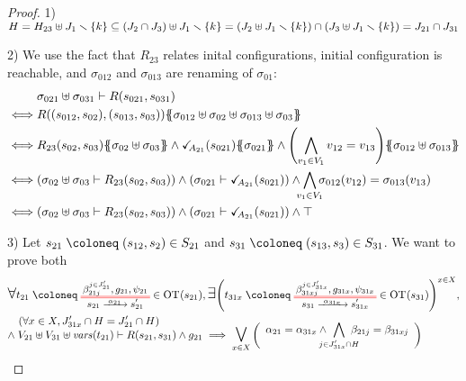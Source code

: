 \documentclass{article}
\begin{document}
\begin{proof}
\item[1)] \(H = H_{23} \uplus J_1 \smallsetminus {\left\{k\right\}} \subseteq {\left(J_2 \cap J_3\right)} \uplus J_1 \smallsetminus {\left\{k\right\}} = {\left(J_2 \uplus J_1 \smallsetminus {\left\{k\right\}}\right)} \cap {\left(J_3 \uplus J_1 \smallsetminus{\left\{k\right\}}\right)} = J_{21} \cap J_{31}\)
\item[2)] We use the fact that \(R_{23}\) relates inital configurations, initial configuration is reachable, and \(\sigma_{012}\) and \(\sigma_{013}\) are renaming of \(\sigma_{01}\):
	\begin{align*}
		& \sigma_{021} \uplus \sigma_{031} \vdash R\mpar{s_{021}, s_{031}} \\
		\iff & R\mpar{\mpar{s_{012}, s_{02}}, \mpar{s_{013}, s_{03}}}\psubst{\sigma_{012} \uplus \sigma_{02} \uplus \sigma_{013} \uplus \sigma_{03}} \\
		\iff & R_{23}\mpar{s_{02}, s_{03}}\psubst{\sigma_{02} \uplus \sigma_{03}} \wedge \reach{A_{21}}\mpar{s_{021}}\psubst{\sigma_{021}} \wedge \mpar{\bigwedge_{v_1 \in V_1} v_{12} = v_{13}}\psubst{\sigma_{012} \uplus \sigma_{013}} \\
		\iff & \mpar{\sigma_{02} \uplus \sigma_{03} \vdash R_{23}\mpar{s_{02}, s_{03}}} \wedge \mpar{\sigma_{021} \vdash \reach{A_{21}}\mpar{s_{021}}} \wedge \bigwedge_\subbox{v_1 \in V_1} \sigma_{012}\mpar{v_{12}} = \sigma_{013}\mpar{v_{13}} \\
		\iff & \mpar{\sigma_{02} \uplus \sigma_{03} \vdash R_{23}\mpar{s_{02}, s_{03}}} \wedge \mpar{\sigma_{021} \vdash \reach{A_{21}}\mpar{s_{021}}} \wedge \top
	\end{align*}
\item[3)] Let \(s_{21} \defobject \mpar{s_{12}, s_2} \in S_{21}\) and \(s_{31} \defobject \mpar{s_{13}, s_3} \in S_{31}\).
	We want to prove both
	\begin{align*}
		& \bigsymb{\forall} t_{21} \defobject \OTx{21}{}{21}{21} \in \fOT{s_{21}}, \bigsymb{\exists} \mpar{t_{31x} \defobject \OTx{31}{x}{31x}{31x} \in \fOT{s_{31}}}^{x \in X}, \\
		& \quad \mpar{\forall x \in X, J'_{31x} \cap H = J'_{21} \cap H} \\[-10pt]
		& \nwedge V_{21} \uplus V_{31} \uplus \fvars{t_{21}} \vdash R\mpar{s_{21}, s_{31}} \wedge g_{21} \implies \operatorname*{\bigsymb{\bigvee}}_{x \in X} \mpar{\everymath{\displaystyle}\begin{array}{l}
			\alpha_{21} = \alpha_{31x} \wedge \bigwedge_\subbox{j \in J'_{31x} \cap H} \beta_{21j} = \beta_{31xj} \\[12pt]

\end{array}}
\end{align*}
\end{proof}
\end{document}
